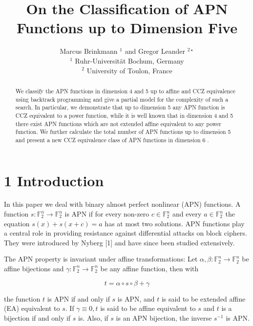 \documentclass[10pt]{article}
\title{On the Classification of APN Functions up to Dimension Five }
\author{Marcus Brinkmann ${ }^{1}$ and Gregor Leander ${ }^{2 \star}$\\
${ }^{1}$ Ruhr-Universität Bochum, Germany\\
${ }^{2}$ University of Toulon, France}
\date{}
\begin{document}
\maketitle
\captionsetup{singlelinecheck=false}


\begin{abstract}
We classify the APN functions in dimension 4 and 5 up to affine and CCZ equivalence using backtrack programming and give a partial model for the complexity of such a search. In particular, we demonstrate that up to dimension 5 any APN function is CCZ equivalent to a power function, while it is well known that in dimension 4 and 5 there exist APN functions which are not extended affine equivalent to any power function. We further calculate the total number of APN functions up to dimension 5 and present a new CCZ equivalence class of APN functions in dimension 6 .
\end{abstract}

\section*{1 Introduction}
In this paper we deal with binary almost perfect nonlinear (APN) functions. A function $s: \mathbb{F}_{2}^{n} \rightarrow \mathbb{F}_{2}^{n}$ is APN if for every non-zero $c \in \mathbb{F}_{2}^{n}$ and every $a \in \mathbb{F}_{2}^{n}$ the equation $s(x)+s(x+c)=a$ has at most two solutions. APN functions play a central role in providing resistance against differential attacks on block ciphers. They were introduced by Nyberg [1] and have since been studied extensively.

The APN property is invariant under affine transformations: Let $\alpha, \beta: \mathbb{F}_{2}^{n} \rightarrow \mathbb{F}_{2}^{n}$ be affine bijections and $\gamma: \mathbb{F}_{2}^{n} \rightarrow \mathbb{F}_{2}^{n}$ be any affine function, then with


\begin{equation*}
t=\alpha \circ s \circ \beta+\gamma \tag{1}
\end{equation*}


the function $t$ is APN if and only if $s$ is APN, and $t$ is said to be extended affine (EA) equivalent to $s$. If $\gamma \equiv 0, t$ is said to be affine equivalent to $s$ and $t$ is a bijection if and only if $s$ is. Also, if $s$ is an APN bijection, the inverse $s^{-1}$ is APN.
\end{document}
